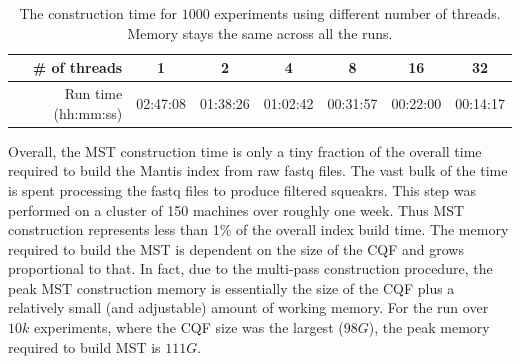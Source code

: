 \begin{table}[t]
    \centering
    \begin{tabular}{r||@{\hskip 0.3in}c@{\hskip 0.3in}c@{\hskip 0.3in}c@{\hskip 0.3in}c@{\hskip 0.3in}c@{\hskip 0.3in}c}
        \hline
        \# of threads  & 1 & 2 & 4 & 8 & 16 & 32\\
        \hline
        Run time (hh:mm:ss) & 02:47:08 & 01:38:26 & 01:02:42 & 00:31:57 & 00:22:00 & 00:14:17\\
        \hline
    \end{tabular}
    \vspace{0.1in}
    \caption{\label{tab:paraBenchmarks} The \mst
    construction time for $1000$ experiments using
    different number of threads.
    Memory stays the same across all the runs.}
    \vspace{-2.5em}
\end{table}

Overall, the MST construction time is only a tiny fraction of the
overall time required to build the Mantis index from raw fastq files.
The vast bulk of the time is spent processing the fastq files to
produce filtered squeakrs.  This step was performed on a cluster
of 150 machines over roughly one week.  Thus MST construction
represents less than 1\% of the overall index build time. The memory required to
build the MST is dependent on the size of the CQF and grows proportional to
that. In fact, due to the multi-pass construction procedure, the peak MST
construction memory is essentially the size of the CQF plus a relatively small
(and adjustable) amount of working memory. For the run over $10k$ experiments,
where the CQF size was the largest ($98G$), the peak memory required to build MST
is $111G$.


